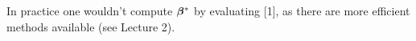 \begin{example}
In practice one wouldn't compute $\bm{\beta}^*$ by evaluating [1], as there are more efficient methods available (see Lecture 2). 

\end{example}
